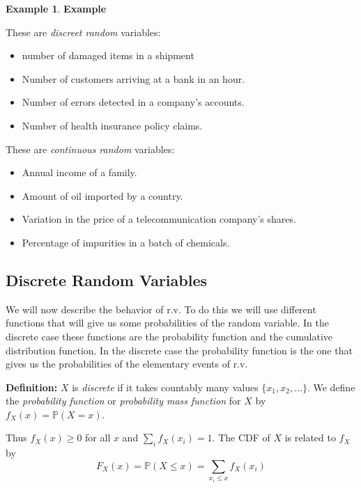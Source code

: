 \documentclass[
]{book}
\providecommand{\tightlist}{%
  \setlength{\itemsep}{0pt}\setlength{\parskip}{0pt}}
\theoremstyle{definition}
\theoremstyle{definition}
\newtheorem{example}{Example}[chapter]
\theoremstyle{definition}
\theoremstyle{definition}
\theoremstyle{remark}
\begin{document}
\begin{example}

\textbf{Example}

These are \emph{discreet random} variables:

\begin{itemize}
\tightlist
\item
  number of damaged items in a shipment
\item
  Number of customers arriving at a bank in an hour.
\item
  Number of errors detected in a company's accounts.
\item
  Number of health insurance policy claims.
\end{itemize}

These are \emph{continuous random} variables:

\begin{itemize}
\tightlist
\item
  Annual income of a family.
\item
  Amount of oil imported by a country.
\item
  Variation in the price of a telecommunication company's shares.
\item
  Percentage of impurities in a batch of chemicals.
\end{itemize}

\end{example}

\hypertarget{discrete-random-variables}{%
\subsection{Discrete Random Variables}\label{discrete-random-variables}}

We will now describe the behavior of r.v. To do this we will use different functions that will give us some probabilities of the random variable. In the discrete case these functions are the probability function and the cumulative distribution function. In the discrete case the probability function is the one that gives us the probabilities of the elementary events of r.v.

\textbf{Definition:} \(X\) is \emph{discrete} if it takes countably many values \(\{x_1,x_2,\dots\}\). We define the \emph{probability function} or \emph{probability mass function} for \(X\) by \(f_X(x)=\mathbb{P}(X=x)\).

Thus \(f_X(x)\geq 0\) for all \(x\) and \(\sum_i f_X(x_i)=1\). The CDF of \(X\) is related to \(f_X\) by
\[
F_X(x)=\mathbb{P}(X\leq x)=\sum_{x_i\leq x}f_X(x_i)
\]
\end{document}
